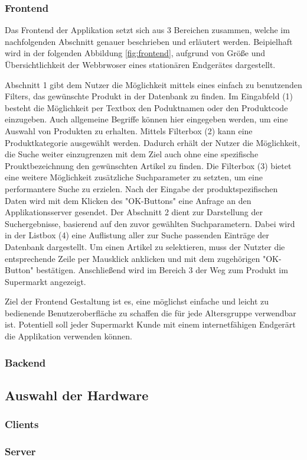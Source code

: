 \subsubsection{Frontend}
\label{sec:frontend}
Das Frontend der Applikation setzt sich aus 3 Bereichen zusammen, welche im nachfolgenden Abschnitt genauer beschrieben und erläutert werden.
Beipielhaft wird in der folgenden Abbildung \ref{fig:frontend}, aufgrund von Größe und Übersichtlichkeit der Webbrwoser eines stationären 
Endgerätes dargestellt.

Abschnitt 1 gibt dem Nutzer die Möglichkeit mittels eines einfach zu benutzenden Filters, das gewünschte Produkt in der Datenbank zu finden.
Im Eingabfeld (1) besteht die Möglichkeit per Textbox den Poduktnamen oder den Produktcode einzugeben. Auch allgemeine Begriffe können hier
eingegeben werden, um eine Auswahl von Produkten zu erhalten. Mittels Filterbox (2) kann eine Produktkategorie ausgewählt werden. Dadurch erhält 
der Nutzer die Möglichkeit, die Suche weiter einzugrenzen mit dem Ziel auch ohne eine spezifische Prouktbezeichnung den gewünschten Artikel 
zu finden. Die Filterbox (3) bietet eine weitere Möglichkeit zusätzliche Suchparameter zu setzten, um eine performantere Suche zu erzielen.
Nach der Eingabe der produktspezifischen Daten wird mit dem Klicken des "OK-Buttons" eine Anfrage an den Applikationsserver gesendet. 
Der Abschnitt 2 dient zur Darstellung der Suchergebnisse, basierend auf den zuvor gewählten Suchparametern. Dabei wird in der Listbox (4) 
eine Auflistung aller zur Suche passenden Einträge der Datenbank dargestellt. Um einen Artikel zu selektieren, muss der Nutzter die entsprechende
Zeile per Mausklick anklicken und mit dem zugehörigen "OK-Button" bestätigen. Anschließend wird im Bereich 3 der Weg zum Produkt im Supermarkt
angezeigt.


Ziel der Frontend Gestaltung ist es, eine möglichst einfache und leicht zu bedienende Benutzeroberfläche zu schaffen die für jede Altersgruppe 
verwendbar ist. Potentiell soll jeder Supermarkt Kunde mit einem internetfähigen Endgerärt die Applikation verwenden können. 



\subsubsection{Backend}
\label{sec:backend}

\subsection{Auswahl der Hardware}
\subsubsection{Clients}
\subsubsection{Server}
